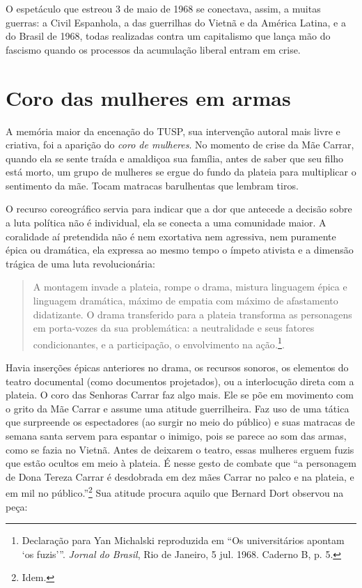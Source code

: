 O espetáculo que estreou 3 de maio de 1968 se conectava, assim, a muitas
guerras: a Civil Espanhola, a das guerrilhas do Vietnã e da América
Latina, e a do Brasil de 1968, todas realizadas contra um capitalismo
que lança mão do fascismo quando os processos da acumulação liberal
entram em crise.

\section{Coro das mulheres em armas}

A memória maior da encenação do TUSP, sua intervenção autoral mais livre
e criativa, foi a aparição do \textit{coro de mulheres}. No momento de
crise da Mãe Carrar, quando ela se sente traída e amaldiçoa sua família,
antes de saber que seu filho está morto, um grupo de mulheres se ergue
do fundo da plateia para multiplicar o sentimento da mãe. Tocam matracas
barulhentas que lembram tiros.

O recurso coreográfico servia para indicar que a dor que antecede a
decisão sobre a luta política não é individual, ela se conecta a uma
comunidade maior. A coralidade aí pretendida não é nem exortativa nem
agressiva, nem puramente épica ou dramática, ela expressa ao mesmo tempo
o ímpeto ativista e a dimensão trágica de uma luta revolucionária:

\begin{quote}
A montagem invade a plateia, rompe o drama, mistura linguagem épica e
linguagem dramática, máximo de empatia com máximo de afastamento
didatizante. O drama transferido para a plateia transforma as
personagens em porta-vozes da sua problemática: a neutralidade e seus
fatores condicionantes, e a participação, o envolvimento na
ação\textit{.}\footnote{Declaração para Yan Michalski reproduzida em “Os
  universitários apontam ‘os fuzis'”. \textit{Jornal do Brasil}, Rio de
  Janeiro, 5 jul. 1968. Caderno B, p. 5.}.
\end{quote}

Havia inserções épicas anteriores no drama, os recursos sonoros, os
elementos do teatro documental (como documentos projetados), ou a
interlocução direta com a plateia. O coro das Senhoras Carrar faz algo
mais. Ele se põe em movimento com o grito da Mãe Carrar e assume uma
atitude guerrilheira. Faz uso de uma tática que surpreende os
espectadores (ao surgir no meio do público) e suas matracas de semana
santa servem para espantar o inimigo, pois se parece ao som das armas,
como se fazia no Vietnã. Antes de deixarem o teatro, essas mulheres
erguem fuzis que estão ocultos em meio à plateia. É nesse gesto de
combate que “a personagem de Dona Tereza Carrar é desdobrada em dez mães
Carrar no palco e na plateia, e em mil no público.”\footnote{Idem.} Sua
atitude procura aquilo que Bernard Dort observou na peça:

